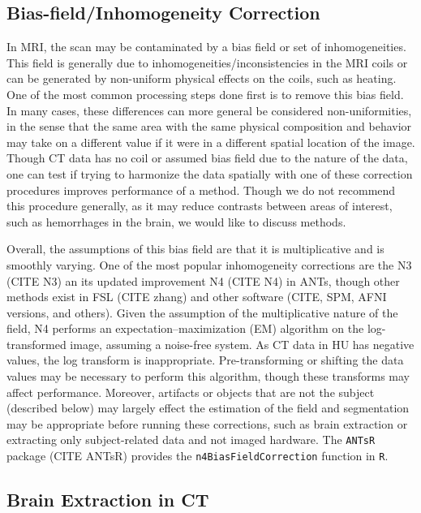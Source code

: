 \documentclass[]{elsarticle} %
\begin{document}
\hypertarget{bias-fieldinhomogeneity-correction}{%
\subsection{Bias-field/Inhomogeneity
Correction}\label{bias-fieldinhomogeneity-correction}}

In MRI, the scan may be contaminated by a bias field or set of
inhomogeneities. This field is generally due to
inhomogeneities/inconsistencies in the MRI coils or can be generated by
non-uniform physical effects on the coils, such as heating. One of the
most common processing steps done first is to remove this bias field. In
many cases, these differences can more general be considered
non-uniformities, in the sense that the same area with the same physical
composition and behavior may take on a different value if it were in a
different spatial location of the image. Though CT data has no coil or
assumed bias field due to the nature of the data, one can test if trying
to harmonize the data spatially with one of these correction procedures
improves performance of a method. Though we do not recommend this
procedure generally, as it may reduce contrasts between areas of
interest, such as hemorrhages in the brain, we would like to discuss
methods.

Overall, the assumptions of this bias field are that it is
multiplicative and is smoothly varying. One of the most popular
inhomogeneity corrections are the N3 (CITE N3) an its updated
improvement N4 (CITE N4) in ANTs, though other methods exist in FSL
(CITE zhang) and other software (CITE, SPM, AFNI versions, and others).
Given the assumption of the multiplicative nature of the field, N4
performs an expectation--maximization (EM) algorithm on the
log-transformed image, assuming a noise-free system. As CT data in HU
has negative values, the log transform is inappropriate.
Pre-transforming or shifting the data values may be necessary to perform
this algorithm, though these transforms may affect performance.
Moreover, artifacts or objects that are not the subject (described
below) may largely effect the estimation of the field and segmentation
may be appropriate before running these corrections, such as brain
extraction or extracting only subject-related data and not imaged
hardware. The \texttt{ANTsR} package (CITE ANTsR) provides the
\texttt{n4BiasFieldCorrection} function in \texttt{R}.

\hypertarget{brain-extraction-in-ct}{%
\subsection{Brain Extraction in CT}\label{brain-extraction-in-ct}}
\end{document}
